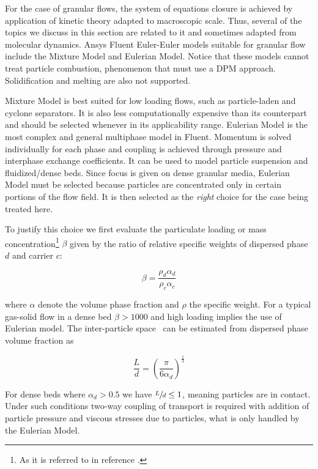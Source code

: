 For the case of granular flows, the system of equations closure is achieved by application of kinetic theory adapted to macroscopic scale. Thus, several of the topics we discuss in this section are related to it and sometimes adapted from molecular dynamics. Ansys Fluent Euler-Euler models suitable for granular flow include the Mixture Model and Eulerian Model. Notice that these models cannot treat particle combustion, phenomenon that must use a DPM approach. Solidification and melting are also not supported.

Mixture Model is best suited for low loading flows, such as particle-laden and cyclone separators. It is also less computationally expensive than its counterpart and should be selected whenever in its applicability range. Eulerian Model is the most complex and general multiphase model in Fluent. Momentum is solved individually for each phase and coupling is achieved through pressure and interphase exchange coefficients. It can be used to model particle suspension and fluidized/dense beds. Since focus is given on dense granular media, Eulerian Model must be selected because particles are concentrated only in certain portions of the flow field. It is then selected as the \emph{right} choice for the case being treated here.

To justify this choice we first evaluate the particulate loading or mass concentration\footnote{As it is referred to in reference \cite{Crowe2011}.} $\beta$ given by the ratio of relative specific weights of dispersed phase $d$ and carrier $c$:

\begin{equation}
\beta=\frac{\rho_{d}\alpha_{d}}{\rho_{c}\alpha_{c}}
\end{equation}

\noindent{}where $\alpha$ denote the volume phase fraction and $\rho$ the specific weight. For a typical gas-solid flow in a dense bed $\beta>1000$ and high loading implies the use of Eulerian model. The inter-particle space~\cite{Crowe2011} can be estimated from dispersed phase volume fraction as

\begin{equation}
\frac{L}{d}=\left(\frac{\pi}{6\alpha_{d}}\right)^{\frac{1}{3}}
\end{equation}

For dense beds where $\alpha_{d}>0.5$ we have $\sfrac{L}{d}\le{}1$, meaning particles are in contact. Under such conditions two-way coupling of transport is required with addition of particle pressure and viscous stresses due to particles, what is only handled by the Eulerian Model.

